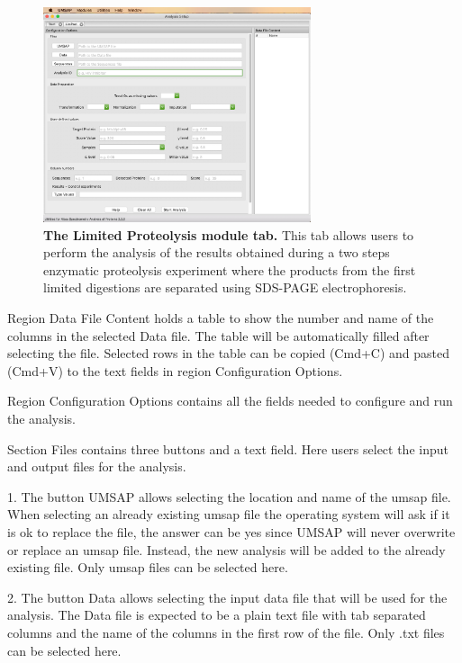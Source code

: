 \begin{figure}[h]
    \centering
    \includegraphics[width=0.7\textwidth]{./IMAGES/MOD-LIMPROT/limprot-mod.jpg}
    \caption[The Limited Proteolysis module tab]{\textbf{The Limited Proteolysis
    module tab.} This tab allows users to perform the analysis of the results obtained
    during a two steps enzymatic proteolysis experiment where the products from the
    first limited digestions are separated using SDS-PAGE electrophoresis.}
    \label{fig:limprotTab}
    \vspace{-5pt}
\end{figure}

Region Data File Content holds a table to show the number and name of the columns in
the selected Data file. The table will be automatically filled after selecting the
file. Selected rows in the table can be copied (Cmd+C) and pasted (Cmd+V) to the
text fields in region Configuration Options.

Region Configuration Options contains all the fields needed to configure and
run the analysis.

Section Files contains three buttons and a text field. Here users select the input
and output files for the analysis.

\num{1}. The button UMSAP allows selecting the location
and name of the umsap file. When selecting an already existing umsap file the operating
system will ask if it is ok to replace the file, the answer can be yes since UMSAP
will never overwrite or replace an umsap file. Instead, the new analysis will be
added to the already existing file. Only umsap files can be selected here.

\num{2}. The button Data allows selecting the input
data file that will be used for the analysis. The Data file is expected to be a
plain text file with tab separated columns and the name of the columns in the first
row of the file. Only .txt files can be selected here.


